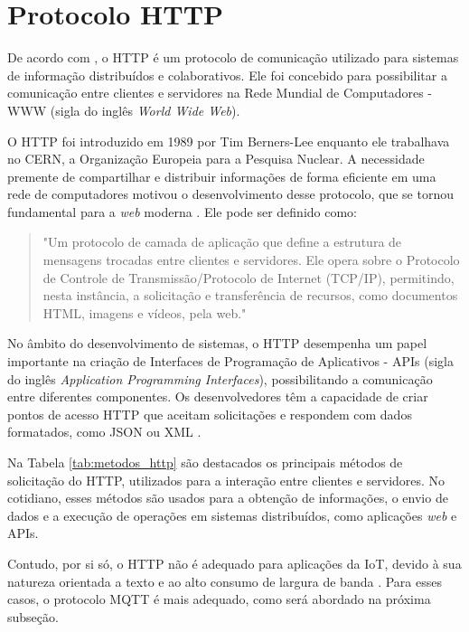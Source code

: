 \section{Protocolo HTTP}
De acordo com \textcite{RFC2616}, o HTTP é um protocolo de comunicação utilizado para sistemas de informação distribuídos e colaborativos. Ele foi concebido para possibilitar a comunicação entre clientes e servidores na Rede Mundial de Computadores - WWW (sigla do inglês \textit{World Wide Web}).

O HTTP foi introduzido em 1989 por Tim Berners-Lee enquanto ele trabalhava no CERN, a Organização Europeia para a Pesquisa Nuclear. A necessidade premente de compartilhar e distribuir informações de forma eficiente em uma rede de computadores motivou o desenvolvimento desse protocolo, que se tornou fundamental para a \textit{web} moderna \parencite{Berners_web}. Ele pode ser definido como:

\begin{quote}
"Um protocolo de camada de aplicação que define a estrutura de mensagens trocadas entre clientes e servidores. Ele opera sobre o Protocolo de Controle de Transmissão/Protocolo de Internet (TCP/IP), permitindo, nesta instância, a solicitação e transferência de recursos, como documentos HTML, imagens e vídeos, pela web." \parencite[{p. 7}]{RFC2616}
\end{quote}

No âmbito do desenvolvimento de sistemas, o HTTP desempenha um papel importante na criação de Interfaces de Programação de Aplicativos - APIs (sigla do inglês \textit{Application Programming Interfaces}), possibilitando a comunicação entre diferentes componentes. Os desenvolvedores têm a capacidade de criar pontos de acesso HTTP que aceitam solicitações e respondem com dados formatados, como JSON ou XML \parencite{Newmann_web}.

Na Tabela \ref{tab:metodos_http} são destacados os principais métodos de solicitação do HTTP, utilizados para a interação entre clientes e servidores. No cotidiano, esses métodos são usados para a obtenção de informações, o envio de dados e a execução de operações em sistemas distribuídos, como aplicações \textit{web} e APIs.

Contudo, por si só, o HTTP não é adequado para aplicações da IoT, devido à sua natureza orientada a texto e ao alto consumo de largura de banda \parencite{Yassein_mqtt2017}. Para esses casos, o protocolo MQTT é mais adequado, como será abordado na próxima subseção.

